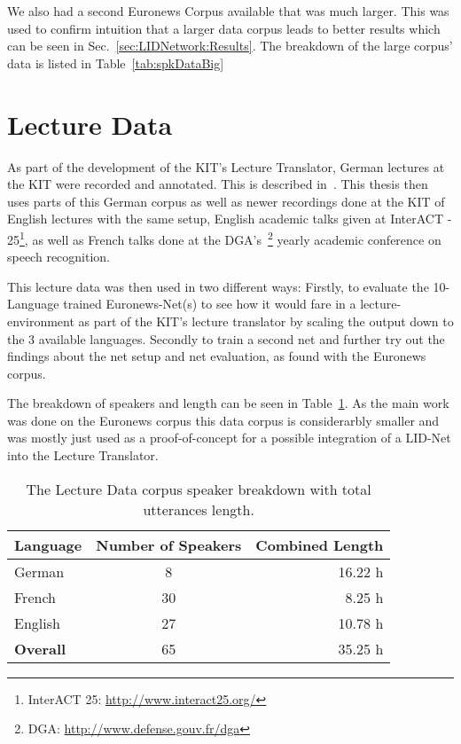 We also had a second Euronews Corpus available that was much larger. This was used to confirm intuition that a larger data corpus leads to better results which can be seen in Sec.~\ref{sec:LIDNetwork:Results}. The breakdown of the large corpus' data is listed in Table~\ref{tab:spkDataBig}

\newpage
\section{Lecture Data}
\label{sec:LITasks:Lecture}

As part of the development of the KIT's Lecture Translator, German lectures at the KIT were recorded and annotated. This is described in~\cite{stuker2012kit}. This thesis then uses parts of this German corpus as well as newer recordings done at the KIT of English lectures with the same setup, English academic talks given at InterACT - 25\footnote{InterACT 25: \url{http://www.interact25.org/}},  as well as French talks done at the DGA's~\footnote{DGA: \url{http://www.defense.gouv.fr/dga}} yearly academic conference on speech recognition. 

This lecture data was then used in two different ways: Firstly, to evaluate the 10-Language trained Euronews-Net(s) to see how it would fare in a lecture-environment as part of the KIT's lecture translator by scaling the output down to the 3 available languages. Secondly to train a second net and further try out the findings about the net setup and net evaluation, as found with the Euronews corpus.

The breakdown of speakers and length can be seen in Table~\ref{tab:spkDataLD}. As the main work was done on the Euronews corpus this data corpus is considerarbly smaller and was mostly just used as a proof-of-concept for a possible integration of a LID-Net into the Lecture Translator. 
\begin{table}[h!]
\label{tab:spkDataLD}
\centering
\begin{tabular}{| l | c | r | }
	\hline
	\textbf{Language} & \textbf{Number of Speakers} & \textbf{Combined Length} \\
	\hline
	German & 8 &  16.22 h \\
	French & 30 & 8.25 h \\  
	English & 27 & 10.78 h \\ 
	\hline
	\textbf{Overall} & 65 & 35.25 h\\
	\hline
	
\end{tabular}
\caption{The Lecture Data corpus speaker breakdown with total utterances length.}
\end{table}


